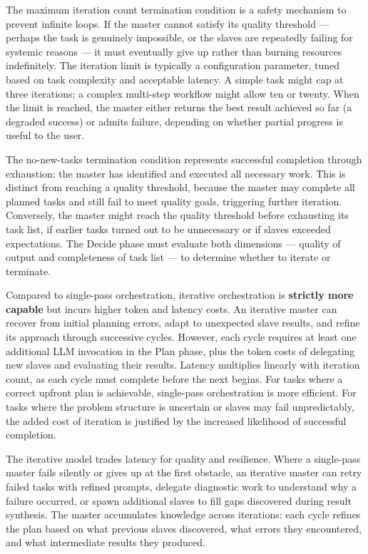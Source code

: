 The maximum iteration count termination condition is a safety mechanism to prevent infinite loops. If the master cannot satisfy its quality threshold — perhaps the task is genuinely impossible, or the slaves are repeatedly failing for systemic reasons — it must eventually give up rather than burning resources indefinitely. The iteration limit is typically a configuration parameter, tuned based on task complexity and acceptable latency. A simple task might cap at three iterations; a complex multi-step workflow might allow ten or twenty. When the limit is reached, the master either returns the best result achieved so far (a degraded success) or admits failure, depending on whether partial progress is useful to the user.

The no-new-tasks termination condition represents successful completion through exhaustion: the master has identified and executed all necessary work. This is distinct from reaching a quality threshold, because the master may complete all planned tasks and still fail to meet quality goals, triggering further iteration. Conversely, the master might reach the quality threshold before exhausting its task list, if earlier tasks turned out to be unnecessary or if slaves exceeded expectations. The Decide phase must evaluate both dimensions — quality of output and completeness of task list — to determine whether to iterate or terminate.

Compared to single-pass orchestration, iterative orchestration is \textbf{strictly more capable} but incurs higher token and latency costs. An iterative master can recover from initial planning errors, adapt to unexpected slave results, and refine its approach through successive cycles. However, each cycle requires at least one additional LLM invocation in the Plan phase, plus the token costs of delegating new slaves and evaluating their results. Latency multiplies linearly with iteration count, as each cycle must complete before the next begins. For tasks where a correct upfront plan is achievable, single-pass orchestration is more efficient. For tasks where the problem structure is uncertain or slaves may fail unpredictably, the added cost of iteration is justified by the increased likelihood of successful completion.

The iterative model trades latency for quality and resilience. Where a single-pass master fails silently or gives up at the first obstacle, an iterative master can retry failed tasks with refined prompts, delegate diagnostic work to understand why a failure occurred, or spawn additional slaves to fill gaps discovered during result synthesis. The master accumulates knowledge across iterations: each cycle refines the plan based on what previous slaves discovered, what errors they encountered, and what intermediate results they produced.

